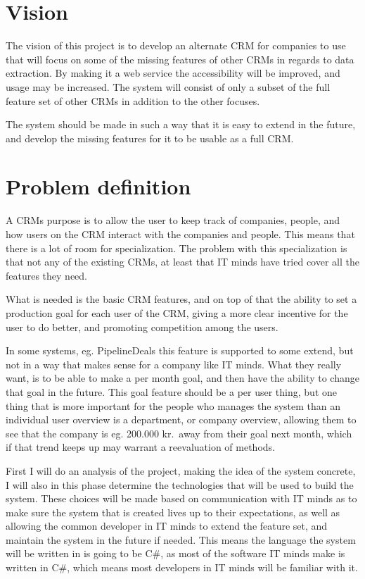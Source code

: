 \section{Vision}
\label{sec:Vision}
The vision of this project is to develop an alternate CRM for companies to use
that will focus on some of the missing features of other CRMs in regards to data
extraction. By making it a web service the accessibility will be improved, and
usage may be increased. The system will consist of only a subset of the full
feature set of other CRMs in addition to the other focuses. 

The system should be made in such a way that it is easy to extend in the future,
and develop the missing features for it to be usable as a full CRM.\

\section{Problem definition}
\label{sec:Problem definition}
A CRMs purpose is to allow the user to keep track of companies, people, and
how users on the CRM interact with the companies and people. This means that
there is a lot of room for specialization. The problem with this specialization
is that not any of the existing CRMs, at least that IT minds have tried cover
all the features they need. 

What is needed is the basic CRM features, and on top of that the ability to set
a production goal for each user of the CRM, giving a more clear incentive for
the user to do better, and promoting competition among the users. 

In some systems, eg. PipelineDeals\cite{pipelinedeals:features} this feature is
supported to some extend, but not in a way that makes sense for a company like
IT minds. What they really want, is to be able to make a per month goal, and
then have the ability to change that goal in the future. This goal feature
should be a per user thing, but one thing that is more important for the people
who manages the system than an individual user overview is a department, or
company overview, allowing them to see that the company is eg. 200.000 kr.\ away
from their goal next month, which if that trend keeps up may warrant a
reevaluation of methods. 

First I will do an analysis of the project, making the idea of the system
concrete, I will also in this phase determine the technologies that will be used
to build the system. These choices will be made based on communication with IT
minds as to make sure the system that is created lives up to their
expectations, as well as allowing the common developer in IT minds to extend the
feature set, and maintain the system in the future if needed. This means the
language the system will be written in is going to be C\#, as most of the
software IT minds make is written in C\#, which means most developers in IT
minds will be familiar with it. 

